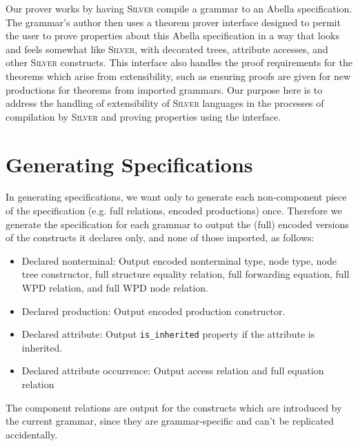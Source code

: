 \documentclass[11pt]{article}
\newcommand{\silver}{\textsc{Silver}}
\begin{document}
Our prover works by having \silver{} compile a grammar to an Abella
specification.  The grammar's author then uses a theorem prover
interface designed to permit the user to prove properties about this
Abella specification in a way that looks and feels somewhat like
\silver, with decorated trees, attribute accesses, and other \silver{}
constructs.  This interface also handles the proof requirements for
the theorems which arise from extensibility, such as ensuring proofs
are given for new productions for theorems from imported grammars.
%
Our purpose here is to address the handling of extensibility of
\silver{} languages in the processes of compilation by \silver{} and
proving properties using the interface.




\section{Generating Specifications} \label{sec:generation}

In generating specifications, we want only to generate each
non-component piece of the specification (e.g. full relations, encoded
productions) once.  Therefore we generate the specification for each
grammar to output the (full) encoded versions of the constructs it
declares only, and none of those imported, as follows:
\begin{itemize}
\item Declared nonterminal:  Output encoded nonterminal type, node
  type, node tree constructor, full structure equality relation, full
  forwarding equation, full WPD relation, and full WPD node relation.
\item Declared production:  Output encoded production constructor.
\item Declared attribute:  Output \texttt{is\_inherited} property if
  the attribute is inherited.
\item Declared attribute occurrence:  Output access relation and full
  equation relation
\end{itemize}
The component relations are output for the constructs which are
introduced by the current grammar, since they are grammar-specific and
can't be replicated accidentally.
\end{document}
